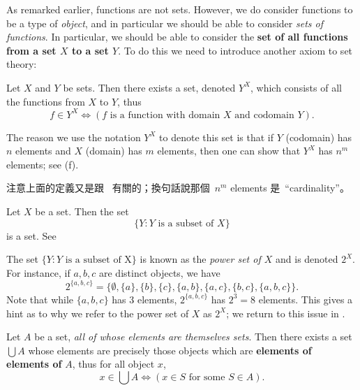 As remarked earlier, functions are not sets.
However, we do consider functions to be a type of \emph{object}, and in particular we should be able to consider \emph{sets of functions}.
In particular, we should be able to consider the \textbf{set of all functions from a set \(X\) to a set \(Y\)}.
To do this we need to introduce another axiom to set theory:

\begin{axiom}  \label{axm 3.10}
Let \(X\) and \(Y\) be sets.
Then there exists a set, denoted \(Y^X\), which consists of all the functions from \(X\) to \(Y\), thus
\[
    f \in Y^X \iff (f \text{\ is a function with domain \(X\) and codomain \(Y\)}).
\]
\end{axiom}

\begin{example}
The reason we use the notation \(Y^X\) to denote this set is that if \(Y\) (codomain) has \(n\) elements and \(X\) (domain) has \(m\) elements, then one can show that \(Y^X\) has \(n^m\) elements; see  (f).
\end{example}

\begin{note}
注意上面的定義又是跟\  有關的；換句話說那個\ \(n^m\) elements 是\ ``cardinality''。
\end{note}

\begin{lemma} \label{lem 3.4.9}
Let \(X\) be a set. Then the set
\[
    \{ Y : Y \text{\ is a subset of\ } X \}
\]
is a set.
See 
\end{lemma}

\begin{remark} \label{remark 3.4.10}
The set \( \{ Y : Y \text{\ is a subset of\ X} \} \) is known as the \emph{power set of \(X\)} and is denoted \(2^X\).
For instance, if \(a, b, c\) are distinct objects, we have
\[
    2^{ \{a,b,c\} } = \{
        \emptyset,
        \{a\},
        \{b\},
        \{c\},
        \{a, b\},
        \{a, c\},
        \{b, c\},
        \{a, b, c\}
    \}.
\]
Note that while \( \{a, b, c\} \) has 3 elements, \(2^{ \{a, b , c\} } \) has \(2^3 = 8\) elements.
This gives a hint as to why we refer to the power set of \(X\) as \(2^X\); we return to this issue in .
\end{remark}

\begin{axiom} [Union] \label{axm 3.11}
Let \(A\) be a set, \emph{all of whose elements are themselves sets}.
Then there exists a set \(\bigcup A\) whose elements are precisely those objects which are \textbf{elements of elements of} \(A\), thus for all object \(x\),
\[
    x \in \bigcup A \iff (x \in S \text{\ for some \(S \in A\)}).
\]
\end{axiom}


